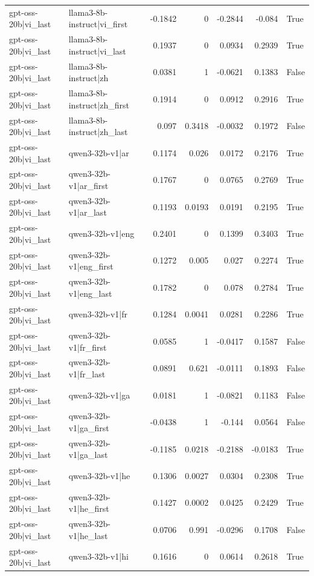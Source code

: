 \begin{table}
\begin{tabular}{l l r r r r l}
gpt-oss-20b|vi_last & llama3-8b-instruct|vi_first & -0.1842 & 0 & -0.2844 & -0.084 & True \\
gpt-oss-20b|vi_last & llama3-8b-instruct|vi_last & 0.1937 & 0 & 0.0934 & 0.2939 & True \\
gpt-oss-20b|vi_last & llama3-8b-instruct|zh & 0.0381 & 1 & -0.0621 & 0.1383 & False \\
gpt-oss-20b|vi_last & llama3-8b-instruct|zh_first & 0.1914 & 0 & 0.0912 & 0.2916 & True \\
gpt-oss-20b|vi_last & llama3-8b-instruct|zh_last & 0.097 & 0.3418 & -0.0032 & 0.1972 & False \\
gpt-oss-20b|vi_last & qwen3-32b-v1|ar & 0.1174 & 0.026 & 0.0172 & 0.2176 & True \\
gpt-oss-20b|vi_last & qwen3-32b-v1|ar_first & 0.1767 & 0 & 0.0765 & 0.2769 & True \\
gpt-oss-20b|vi_last & qwen3-32b-v1|ar_last & 0.1193 & 0.0193 & 0.0191 & 0.2195 & True \\
gpt-oss-20b|vi_last & qwen3-32b-v1|eng & 0.2401 & 0 & 0.1399 & 0.3403 & True \\
gpt-oss-20b|vi_last & qwen3-32b-v1|eng_first & 0.1272 & 0.005 & 0.027 & 0.2274 & True \\
gpt-oss-20b|vi_last & qwen3-32b-v1|eng_last & 0.1782 & 0 & 0.078 & 0.2784 & True \\
gpt-oss-20b|vi_last & qwen3-32b-v1|fr & 0.1284 & 0.0041 & 0.0281 & 0.2286 & True \\
gpt-oss-20b|vi_last & qwen3-32b-v1|fr_first & 0.0585 & 1 & -0.0417 & 0.1587 & False \\
gpt-oss-20b|vi_last & qwen3-32b-v1|fr_last & 0.0891 & 0.621 & -0.0111 & 0.1893 & False \\
gpt-oss-20b|vi_last & qwen3-32b-v1|ga & 0.0181 & 1 & -0.0821 & 0.1183 & False \\
gpt-oss-20b|vi_last & qwen3-32b-v1|ga_first & -0.0438 & 1 & -0.144 & 0.0564 & False \\
gpt-oss-20b|vi_last & qwen3-32b-v1|ga_last & -0.1185 & 0.0218 & -0.2188 & -0.0183 & True \\
gpt-oss-20b|vi_last & qwen3-32b-v1|he & 0.1306 & 0.0027 & 0.0304 & 0.2308 & True \\
gpt-oss-20b|vi_last & qwen3-32b-v1|he_first & 0.1427 & 0.0002 & 0.0425 & 0.2429 & True \\
gpt-oss-20b|vi_last & qwen3-32b-v1|he_last & 0.0706 & 0.991 & -0.0296 & 0.1708 & False \\
gpt-oss-20b|vi_last & qwen3-32b-v1|hi & 0.1616 & 0 & 0.0614 & 0.2618 & True \\

\end{tabular}
\end{table}
